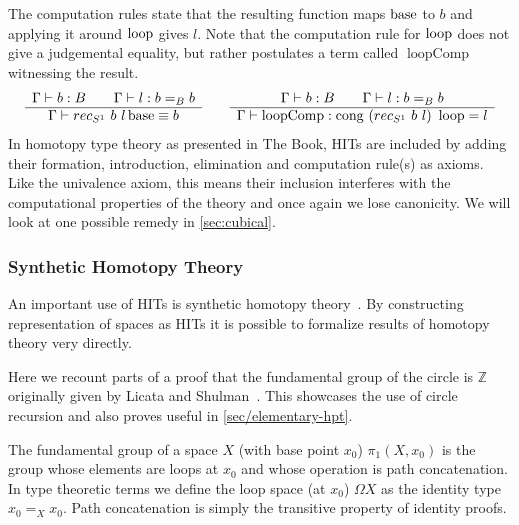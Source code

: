 The computation rules state that the resulting function maps $\operatorname{base}$ to $b$
and applying it around $\operatorname{loop}$ gives $l$.
Note that the computation rule for $\operatorname{loop}$ does not give a judgemental
equality, but rather postulates a term called $\operatorname{loopComp}$
witnessing the result.
\begin{equation*}
  \begin{array}[t]{c}
    \Gamma \vdash b : B \qquad \Gamma \vdash l : b =_B b\\
    \hline
    \Gamma \vdash rec_{S^1}~b~l \operatorname{base} \equiv b
  \end{array}
  \qquad
  \begin{array}[t]{c}
    \Gamma \vdash b : B \qquad \Gamma \vdash l : b =_B b\\
    \hline
    \Gamma \vdash \operatorname{loopComp} : \operatorname{cong}~(rec_{S^1}~b~l)~\operatorname{loop} = l
  \end{array}
\end{equation*}
In homotopy type theory as presented in The Book, HITs are included by adding
their formation, introduction, elimination and computation rule(s) as axioms.
Like the univalence axiom, this means their inclusion interferes with the
computational properties of the theory and once again we lose canonicity.
We will look at one possible remedy in \autoref{sec:cubical}.

\subsubsection{Synthetic Homotopy Theory}
An important use of HITs is synthetic homotopy theory~\cite{mortberg2020cubical,
  licata2015cubical}. By constructing representation of spaces as HITs it is
possible to formalize results of homotopy theory very directly.

Here we recount parts of a proof that the fundamental group of the circle is $\mathbb{Z}$
originally given by Licata and Shulman~\cite{licata2013circle}. This showcases the use of circle
recursion and also proves useful in \autoref{sec/elementary-hpt}.

The fundamental group of a space $X$ (with base point $x_0$) $\pi_1(X, x_0)$ is
the group whose elements are loops at $x_0$ and whose operation is path
concatenation. In type theoretic terms we define the loop space (at $x_0$) $\Omega X$ as the
identity type $x_0 =_X x_0$. Path concatenation is simply the transitive
property of identity proofs.

